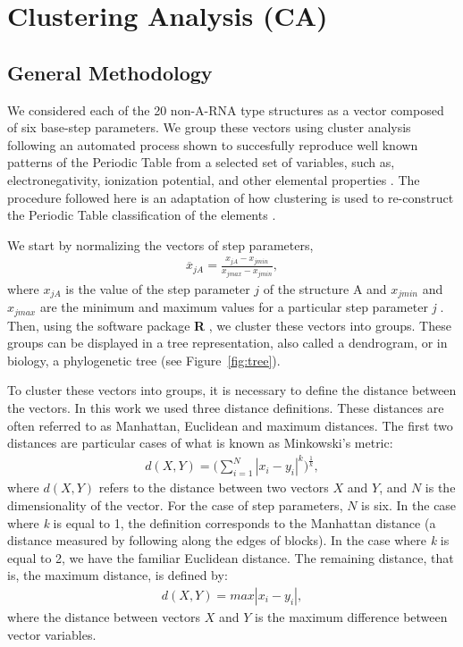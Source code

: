 \chapter{Clustering Analysis (CA)}
\label{appendix_a}

\section{General Methodology}
We considered  each of  the 20 non-A-RNA  type structures as  a vector
composed of  six base-step parameters.   We group these  vectors using
cluster analysis  following an automated process  shown to succesfully
reproduce well  known patterns of  the Periodic Table from  a selected
set  of variables, such  as, electronegativity,  ionization potential,
and  other elemental  properties  \cite{restrepo2004}.  The  procedure
followed  here  is  an  adaptation   of  how  clustering  is  used  to
re-construct  the  Periodic   Table  classification  of  the  elements
\cite{restrepo2006}.

We start by normalizing the vectors of step parameters,
\begin{gather}
\label{eq:normalization}  
\overline{x}_{jA}=\frac{x_{jA}-x_{jmin}}{x_{jmax}-x_{jmin}},
\end{gather}
where ${x}_{jA}$ is the value  of the step parameter $j$ of the
structure A and $x_{jmin}$ and  $x_{jmax}$ are the minimum and maximum
values for a particular step parameter \textit{j} \cite{restrepo2006}.
Then,  using  the  software  package \textbf{R}  \cite{ihaka1996},  we
cluster these vectors into groups.  These groups can be displayed in a
tree  representation,  also called  a  dendrogram,  or  in biology,  a
phylogenetic tree (see Figure~\ref{fig:tree}).

To cluster these vectors into groups, it is necessary to define the
distance between  the vectors. In  this work we used  three distance
definitions.   These distances  are  often referred  to as  Manhattan,
Euclidean  and   maximum  distances.  The  first   two  distances  are
particular cases of what is known as Minkowski's metric:
\begin{gather}
d(X,Y)= \Big( \sum_{i=1}^N |x_i-y_i|^k \Big)^\frac{1}{k},
\end{gather}
where $d(X,Y)$ refers to the distance between two vectors $X$ and $Y$,
and $N$ is  the dimensionality of the vector.  For  the case of step
parameters, $N$ is  six.  In the case where \textit{k}  is equal to 1,
the  definition  corresponds to  the  Manhattan  distance (a  distance
measured by  following along the edges  of blocks). In  the case where
\textit{k} is equal to 2, we have the familiar Euclidean distance. The
remaining distance, that is, the maximum distance, is defined by:
\begin{gather}
d(X,Y) = max |x_{i}-y_{i}|,
\end{gather}
where  the  distance  between  vectors  $X$ and  $Y$  is  the  maximum
difference between vector variables.

